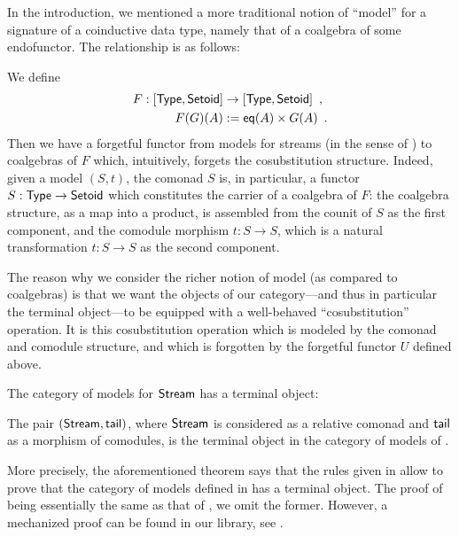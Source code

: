 \documentclass[a4paper,USenglish]{lipics}
\begin{document}
In the introduction, we mentioned a more traditional notion of \enquote{model} for a signature of a coinductive data type, 
namely that of a coalgebra of some endofunctor. The relationship is as follows:

\begin{rem}\label{rem:coalg_stream}
 We define 
  \begin{align*}  F: [\mathsf{Type},\mathsf{Setoid}] &\to [\mathsf{Type},\mathsf{Setoid}]  \enspace , \\
                      F(G)(A) &:= \mathsf{eq}(A) \times G(A) \enspace .
  \end{align*}
  Then we have a forgetful functor from models for streams (in the sense of ) to coalgebras of $F$ which, intuitively, forgets the cosubstitution structure.
  Indeed, given a model $(S,t)$, the comonad $S$ is, in particular, a functor $S:\mathsf{Type}\to\mathsf{Setoid}$ which constitutes the carrier of 
  a coalgebra of $F$: the coalgebra structure, as a map into a product, 
  is assembled from the counit of $S$ as the first component, and the comodule morphism $t:S\to S$, which
  is a natural transformation $t : S \to S$ as the second component.
\end{rem}
  
  The reason why we consider the richer notion of model (as compared to coalgebras) is that we want the objects of 
  our category---and thus in particular the terminal object---to be equipped with a well-behaved \enquote{cosubstitution} operation.
  It is this cosubstitution operation which is modeled by the comonad and comodule structure, and which is forgotten by 
  the forgetful functor $U$ defined above.

  
  The category of models for $\mathsf{Stream}$ has a terminal object:
  
\begin{thm}\label{thm_stream_terminal}
 The pair $(\mathsf{Stream}, \mathsf{tail})$, where $\mathsf{Stream}$ is considered as a relative comonad and $\mathsf{tail}$ as
 a morphism of comodules, is the terminal object in the category of models of .
\end{thm}

\begin{Long}
More precisely, the aforementioned theorem says that the rules given in  allow to prove that
the category of models defined in  has a terminal object.
The proof of  being essentially the same as that of , we omit the former.
However, a mechanized proof can be found in our \coq library, see .
\end{Long}
\end{document}
